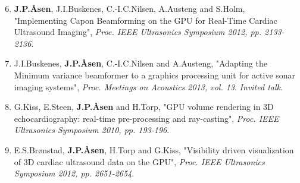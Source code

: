 \documentclass[10pt,b5paper,twoside]{book}
\begin{document}
\begin{enumerate}[VI]
\setcounter{enumi}{5}
\renewcommand\labelenumi{\bfseries\theenumi}

	\item \textbf{J.\:P.\:\AA{}sen}, J.\:I.\:Buskenes, C.-I.\:C.\:Nilsen, A.\:Austeng and S.\:Holm, "Implementing Capon Beamforming on the GPU for Real-Time Cardiac Ultrasound Imaging", {\it Proc. IEEE Ultrasonics Symposium 2012, pp. 2133-2136}.

	\item J.\:I.\:Buskenes, \textbf{J.\:P.\:\AA{}sen}, C.-I.\:C.\:Nilsen and A.\:Austeng, "Adapting the Minimum variance beamformer to a graphics processing unit for active sonar imaging systems", {\it Proc. Meetings on Acoustics 2013, vol. 13}. \textit{Invited talk}.
	
	\item G.\:Kiss, E.\:Steen, \textbf{J.\:P.\:\AA{}sen} and H.\:Torp, "GPU volume rendering in 3D echocardiography: real-time pre-processing and ray-casting", {\it Proc. IEEE Ultrasonics Symposium 2010, pp. 193-196}.


	\item E.\:S.\:Br\o{}nstad, \textbf{J.\:P.\:\AA{}sen}, H.\:Torp and G.\:Kiss, "Visibility driven visualization of 3D cardiac ultrasound data on the GPU", {\it Proc. IEEE Ultrasonics Symposium 2012, pp. 2651-2654}.
\end{enumerate}

\newpage\thispagestyle{empty}
\pagestyle{fancy}

%

\cleardoublepage
{}
\renewcommand*\contentsname{Contents}
\tableofcontents

\cleardoublepage
{}
\printnomenclature

\cleardoublepage
\setcounter{page}{1}
\renewcommand{\thepage}{\arabic{page}}


\begin{bibunit}[IEEEtran]

\newpage{}
\end{bibunit}
\end{document}
